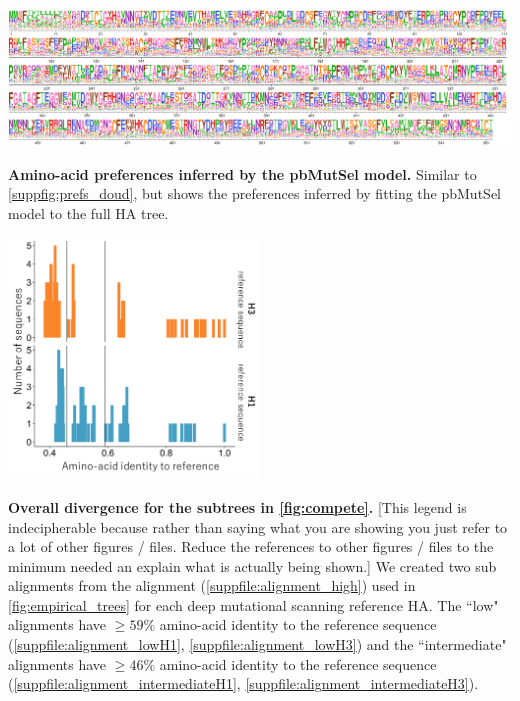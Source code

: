 \documentclass[11pt]{article}
\newcommand\jdbcomment[1]{{\color{red}[#1]}}
\begin{document}
\begin{suppfig}[H]
\centerline{\includegraphics[width=\textwidth]{figures/prefs_mutSel}}
\caption{\label{suppfig:prefs_mutSel}
\textbf{Amino-acid preferences inferred by the pbMutSel model.}
Similar to \ref{suppfig:prefs_doud}, but shows the preferences inferred by fitting the pbMutSel model to the full HA tree.
}
\end{suppfig}

\begin{suppfig}[H]
\centerline{\includegraphics[width=0.50\textwidth]{figures/divergence_distances.pdf}}
\caption{\label{suppfig:subalignments}
\textbf{Overall divergence for the subtrees in \ref{fig:compete}.} 
\jdbcomment{This legend is indecipherable because rather than saying what you are showing you just refer to a lot of other figures / files.
Reduce the references to other figures / files to the minimum needed an explain what is actually being shown.}
We created two sub alignments from the alignment (\ref{suppfile:alignment_high}) used in \ref{fig:empirical_trees} for each deep mutational scanning reference HA. 
The ``low" alignments have $\ge59\%$ amino-acid identity to the reference sequence (\ref{suppfile:alignment_lowH1}, \ref{suppfile:alignment_lowH3}) and the ``intermediate" alignments have $\ge46\%$ amino-acid identity to the reference sequence (\ref{suppfile:alignment_intermediateH1}, \ref{suppfile:alignment_intermediateH3}).
}
\end{suppfig}
\end{document}
